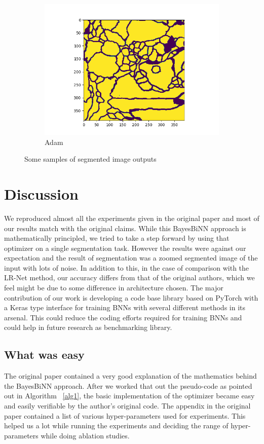 \begin{figure}[h]
\begin{subfigure}[b]{0.3\textwidth}
         \includegraphics[width=1.3\textwidth]{../openreview/figs/output_normal.png}
         \caption{Adam}
     \end{subfigure}
        \caption{Some samples of segmented image outputs}
        \label{fig5}
\end{figure}



\section{Discussion}
We reproduced almost all the experiments given in the original paper and most of our results match with the original claims. While this BayesBiNN approach is mathematically principled, we tried to take a step forward by using that optimizer on a single segmentation task. However the results were against our expectation and the result of segmentation was a zoomed segmented image of the input with lots of noise. In addition to this, in the case of comparison with the LR-Net method, our accuracy differs from that of the original authors, which we feel might be due to some difference in architecture chosen. The major contribution of our work is developing a code base library based on PyTorch with a Keras type interface for training BNNs with several different methods in its arsenal. This could reduce the coding efforts required for training BNNs and could help in future research as benchmarking library.

\subsection{What was easy}
The original paper contained a very good explanation of the mathematics behind the BayesBiNN approach. After we worked that out the pseudo-code as pointed out in Algorithm ~\ref{alg1}, the basic implementation of the optimizer became easy and easily verifiable by the author's original code. The appendix in the original paper contained a list of various hyper-parameters used for experiments. This helped us a lot while running the experiments and deciding the range of hyper-parameters while doing ablation studies.

